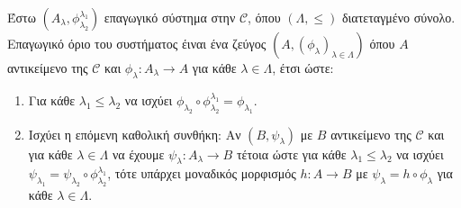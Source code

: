 \begin{defn}
    Έστω $(A_{\lambda},\phi^{\lambda_1}_{\lambda_2})$ επαγωγικό σύστημα στην $\mathcal{C}$, όπου $(\Lambda,\leq)$ διατεταγμένο σύνολο. Επαγωγικό όριο του συστήματος έιναι ένα ζεύγος $(A,(\phi_{\lambda})_{\lambda \in \Lambda})$ όπου $A$ αντικείμενο της $\mathcal{C}$ και $\phi_{\lambda}:A_{\lambda} \rightarrow A$ για κάθε $\lambda \in \Lambda$, έτσι ώστε:
    \begin{enumerate}
        \item Για κάθε $\lambda_1 \leq \lambda_2$ να ισχύει $\phi_{\lambda_2} \circ \phi^{\lambda_1}_{\lambda_2} = \phi_{\lambda_1}$.
        \begin{figure}[H]
            \centering
        \end{figure}

        \item Ισχύει η επόμενη καθολική συνθήκη: Αν $(B,\psi_{\lambda})$ με $B$ αντικείμενο της $\mathcal{C}$ και για κάθε $\lambda \in \Lambda$ να έχουμε $\psi_{\lambda}:A_{\lambda}\rightarrow B$ τέτοια ώστε για κάθε $\lambda_1 \leq \lambda_2$ να ισχύει $\psi_{\lambda_1} = \psi_{\lambda_2} \circ \phi^{\lambda_1}_{\lambda_2}$, τότε υπάρχει μοναδικός μορφισμός $h:A\rightarrow B$ με $\psi_{\lambda} = h\circ \phi_{\lambda}$ για κάθε $\lambda \in \Lambda$.
            \begin{figure}[H]
                \centering
            \end{figure}
    \end{enumerate}

\end{defn}

